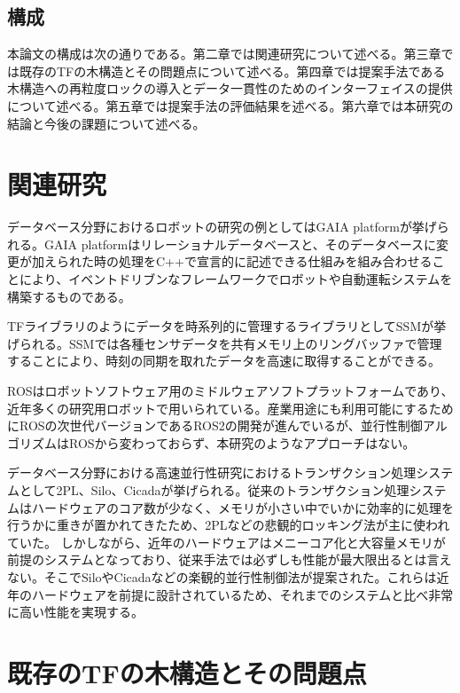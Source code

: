 \documentclass[a4paper]{jreport}	%
\begin{document}
\section{構成}
本論文の構成は次の通りである。第二章では関連研究について述べる。第三章では既存のTFの木構造とその問題点について述べる。第四章では提案手法である木構造への再粒度ロックの導入とデータ一貫性のためのインターフェイスの提供について述べる。第五章では提案手法の評価結果を述べる。第六章では本研究の結論と今後の課題について述べる。

\chapter{関連研究}

データベース分野におけるロボットの研究の例としてはGAIA platform\cite{gaia}が挙げられる。GAIA platformはリレーショナルデータベースと、そのデータベースに変更が加えられた時の処理をC++で宣言的に記述できる仕組みを組み合わせることにより、イベントドリブンなフレームワークでロボットや自動運転システムを構築するものである。

TFライブラリのようにデータを時系列的に管理するライブラリとしてSSMが挙げられる。SSMでは各種センサデータを共有メモリ上のリングバッファで管理することにより、時刻の同期を取れたデータを高速に取得することができる。


ROSはロボットソフトウェア用のミドルウェアソフトプラットフォームであり、近年多くの研究用ロボットで用いられている。産業用途にも利用可能にするためにROSの次世代バージョンであるROS2\cite{ros2}の開発が進んでいるが、並行性制御アルゴリズムはROSから変わっておらず、本研究のようなアプローチはない。

データベース分野における高速並行性研究におけるトランザクション処理システムとして2PL、Silo、Cicadaが挙げられる。従来のトランザクション処理システムはハードウェアのコア数が少なく、メモリが小さい中でいかに効率的に処理を行うかに重きが置かれてきたため、2PLなどの悲観的ロッキング法が主に使われていた。
しかしながら、近年のハードウェアはメニーコア化と大容量メモリが前提のシステムとなっており、従来手法では必ずしも性能が最大限出るとは言えない。そこでSilo\cite{silo}やCicada\cite{Cicada}などの楽観的並行性制御法が提案された。これらは近年のハードウェアを前提に設計されているため、それまでのシステムと比べ非常に高い性能を実現する。

\chapter{既存のTFの木構造とその問題点}
\end{document}
